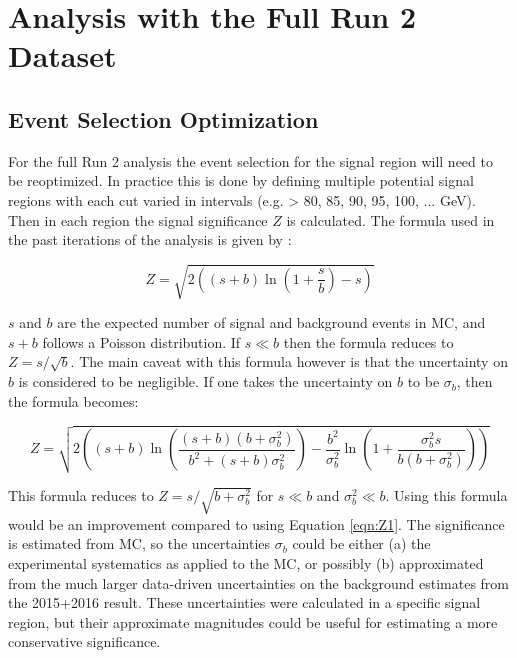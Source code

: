 \chapter{Analysis with the Full Run 2 Dataset}
\label{chapter:fullRun2}

\section{Event Selection Optimization}

For the full Run 2 analysis the event selection for the signal region will need to be reoptimized. In practice this is done by defining multiple potential signal regions with each cut varied in intervals (e.g. \etmiss > 80, 85, 90, 95, 100, ... GeV). Then in each region the signal significance $Z$ is calculated. The formula used in the past iterations of the analysis is given by \cite{Cowan1}:

\begin{equation}
Z = \sqrt{2 \left( (s+b) \ln \left( 1+\frac{s}{b} \right) -s \right)} 
\label{eqn:Z1}
\end{equation}

\noindent $s$ and $b$ are the expected number of signal and background events in MC, and $s+b$ follows a Poisson distribution. If $s \ll b$ then the formula reduces to $Z = s/\sqrt{b}$. The main caveat with this formula however is that the uncertainty on $b$ is considered to be negligible. If one takes the uncertainty on $b$ to be $\sigma_b$, then the formula becomes:

\begin{equation}
Z = \sqrt{2 \left( (s+b) \ln \left( \frac{(s+b)(b+\sigma_b^2)}{b^2+(s+b)\sigma_b^2} \right) - \frac{b^2}{\sigma_b^2} \ln \left( 1 + \frac{\sigma_b^2 s}{b(b+\sigma_b^2)} \right) \right)} 
\label{eqn:Z2}
\end{equation}

\noindent This formula reduces to $Z = s/\sqrt{b+\sigma_b^2}$ for $s \ll b$ and $\sigma_b^2 \ll b$. Using this formula would be an improvement compared to using Equation \ref{eqn:Z1}. The significance is estimated from MC, so the uncertainties $\sigma_b$ could be either (a) the experimental systematics as applied to the MC, or possibly (b) approximated from the much larger data-driven uncertainties on the background estimates from the 2015+2016 result. These uncertainties were calculated in a specific signal region, but their approximate magnitudes could be useful for estimating a more conservative significance. 

